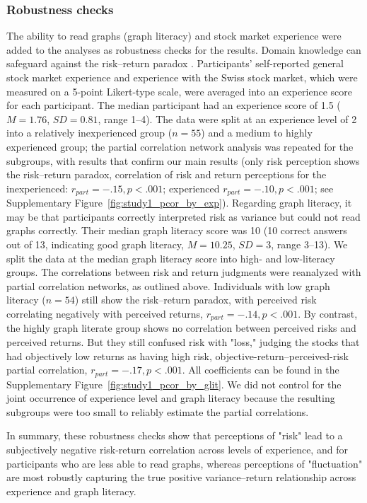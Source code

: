 \documentclass[a4paper,man, natbib,floatsintext]{apa6} %
\begin{document}
\subsubsection{Robustness checks}
 The ability to read graphs (graph literacy) and stock market experience were added to the analyses as robustness checks for the results. Domain knowledge can safeguard against the risk--return paradox \citep[e.g.,][]{Fleming2012}. Participants' self-reported general stock market experience and experience with the Swiss stock market, which were measured on a 5-point Likert-type scale, were averaged into an experience score for each participant. The median participant had an experience score of 1.5 ($M=1.76$, $SD=0.81$, range 1--4). The data were split at an experience level of 2 into a relatively inexperienced group ($n=55$) and a medium to highly experienced group; the partial correlation network analysis was repeated for the subgroups, with results that confirm our main results (only risk perception shows the risk--return paradox, correlation of risk and return perceptions for the inexperienced: $r_{part}=-.15, p < .001$; experienced $r_{part}=-.10, p < .001$; see  Supplementary Figure~\ref{fig:study1_pcor_by_exp}). Regarding graph literacy, it may be that participants correctly interpreted risk as variance but could not read graphs correctly. Their median graph literacy score was 10 (10 correct answers out of 13, indicating good graph literacy, $M=10.25$, $SD=3$, range 3--13). We split the data at the median graph literacy score into high- and low-literacy groups. The correlations between risk and return judgments were reanalyzed with partial correlation networks, as outlined above. Individuals with low graph literacy ($n=54$) still show the risk--return paradox, with perceived risk correlating negatively with perceived returns, $r_{part} = -.14, p  <  .001$. By contrast, the highly graph literate group shows no correlation between perceived risks and perceived returns. But they still confused risk with "loss," judging the stocks that had objectively low returns as having high risk, objective-return--perceived-risk partial correlation, $r_{part}=-.17, p < .001$. All coefficients can be found in the Supplementary Figure~\ref{fig:study1_pcor_by_glit}. We did not control for the joint occurrence of experience level and graph literacy because the resulting subgroups were too small to reliably estimate the partial correlations.

In summary, these robustness checks show that perceptions of "risk" lead to a subjectively negative risk-return correlation across levels of experience, and for participants who are less able to read graphs, whereas perceptions of "fluctuation" are most robustly capturing the true positive variance--return relationship across experience and graph literacy. 
\end{document}
